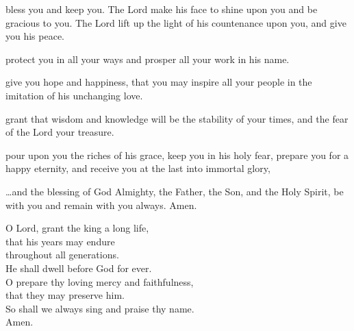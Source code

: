 {



 bless you and keep you.
The Lord make his face to shine upon you and be gracious to you.
The Lord lift up the light of his countenance upon you, and give you his peace.



 protect you in all your ways and prosper all your work in his name.




 give you hope and happiness, that you may inspire all your people in
the imitation of his unchanging love.


 grant that wisdom and knowledge will be the stability of your times,
and the fear of the Lord your treasure.




 pour upon you the riches of his grace,
keep you in his holy fear,
prepare you for a happy eternity,
and receive you at the last into immortal glory,


 …and the blessing of God Almighty,
the Father, the Son, and the Holy Spirit,
be with you and remain with you always. Amen.

\vfill 



\begin{center}
O Lord, grant the king a long life,\\that his years may endure\\
throughout all generations.\\
He shall dwell before God for ever.\\
O prepare thy loving mercy and faithfulness,\\that they may preserve him.\\
So shall we always sing and praise thy name.\\
Amen.
\end{center}\clearpage





}
